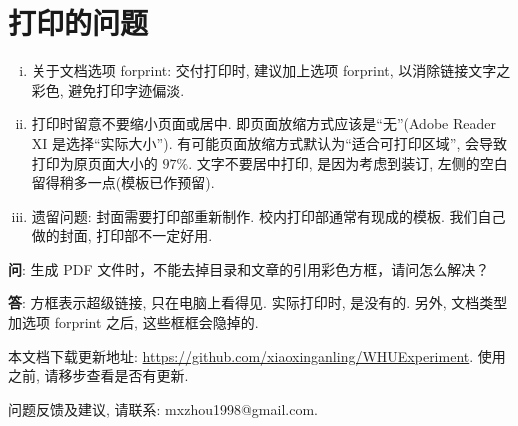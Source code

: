 \section{打印的问题}

{\textbf{}}

\begin{enumerate}[i)] 
  \item  关于文档选项 forprint: 交付打印时, 建议加上选项 forprint, 以消除链接文字之彩色, 避免打印字迹偏淡.
  \item  打印时留意不要缩小页面或居中. 即页面放缩方式应该是``无''(Adobe Reader XI 是选择``实际大小'').
           有可能页面放缩方式默认为``适合可打印区域'', 会导致打印为原页面大小的 $97\%$.
           文字不要居中打印, 是因为考虑到装订, 左侧的空白留得稍多一点(模板已作预留).
  \item  遗留问题: 封面需要打印部重新制作.  校内打印部通常有现成的模板.
           我们自己做的封面, 打印部不一定好用.
\end{enumerate}

\textbf{问}: {\kaishu 生成 PDF 文件时，不能去掉目录和文章的引用彩色方框，请问怎么解决？}

\textbf{答}: {\kaishu 方框表示超级链接, 只在电脑上看得见. 实际打印时, 是没有的. 另外, 文档类型加选项 forprint 之后, 这些框框会隐掉的. }

 \vfill

本文档下载更新地址: \url{https://github.com/xiaoxinganling/WHUExperiment}. 使用之前, 请移步查看是否有更新.

问题反馈及建议, 请联系: mxzhou1998@gmail.com.